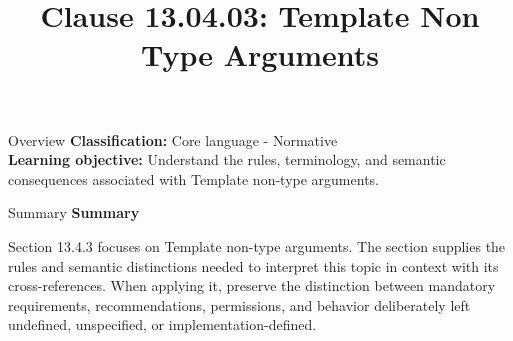 \documentclass[10pt,letterpaper]{article}
\title{Clause 13.04.03: Template Non Type Arguments}
\author{}
\date{}
\begin{document}
\maketitle
\begin{CornellOverviewBox}{Overview}
\textbf{Classification:} Core language - Normative\\[2pt]
\textbf{Learning objective:} Understand the rules, terminology, and semantic consequences associated with Template non-type arguments.
\end{CornellOverviewBox}\begin{CornellSummaryBox}{Summary}
{\sffamily\bfseries\color{Accent} Summary}\par\vspace{3pt}Section 13.4.3 focuses on Template non-type arguments. The section supplies the rules and semantic distinctions needed to interpret this topic in context with its cross-references. When applying it, preserve the distinction between mandatory requirements, recommendations, permissions, and behavior deliberately left undefined, unspecified, or implementation-defined.
\end{CornellSummaryBox}
\end{document}

